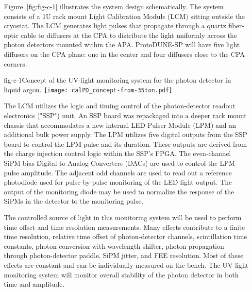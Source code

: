 Figure~\ref{fig:fig-c-1} illustrates the system design schematically. The system consists of a 1U rack mount Light Calibration Module (LCM) sitting outside the cryostat. The LCM generates light pulses that propagate through a quartz fiber-optic cable to diffusers at the CPA to distribute the light uniformly across the photon detectors mounted within the APA.  ProtoDUNE-SP will have five light 
diffusers on the CPA plane: one in the center and four diffusers close to the CPA corners. 
%
 \begin{cdrfigure}{fig-c-1}{Concept of the UV-light monitoring system for the photon detector in liquid argon.}
\texttt{[image: calPD\_concept-from-35ton.pdf]}
\end{cdrfigure}
%


The LCM utilizes the logic and timing control of the photon-detector readout electronics ("SSP") unit.  
An SSP board was repackaged into a deeper rack mount chassis that accommodates a new internal 
LED Pulser Module (LPM) and an additional bulk power supply. The LPM utilizes five digital outputs from the SSP board to control the LPM pulse and its duration.  
These outputs are derived from the charge injection control logic within the SSP's FPGA.  
The even-channel SiPM bias Digital to Analog Converters (DACs)
are used to control the LPM pulse amplitude.  
The adjacent odd channels are used to read out a reference photodiode used for pulse-by-pulse monitoring of the LED light output.  
The output of the monitoring diode may be used to normalize 
the response of the SiPMs in the detector to the monitoring pulse.




The controlled source of light %
in this monitoring system will be used to perform time offset and time resolution measurements.  
Many effects contribute to a finite time resolution, relative time offset of photon-detector channels, scintillation time constants, 
photon conversion with wavelength shifter, photon propagation through photon-detector paddle, SiPM jitter, and FEE resolution. 
Most of these effects are constant and can be individually 
measured on the bench.  The UV light monitoring system will monitor overall stability of the photon detector in both time
and amplitude.
